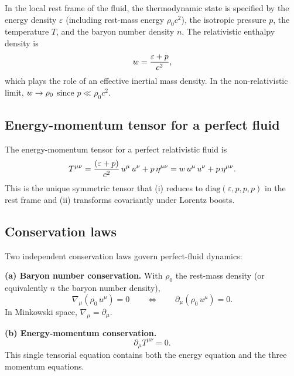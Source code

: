 In the local rest frame of the fluid, the thermodynamic state is
specified by the energy density $\varepsilon$ (including rest-mass
energy $\rho_0 c^2$), the isotropic pressure $p$, the temperature
$T$, and the baryon number density $n$.  The relativistic enthalpy
density is
\begin{equation}
  w = \frac{\varepsilon + p}{c^2},
  \label{eq:rel-enthalpy}
\end{equation}
which plays the role of an effective inertial mass density.  In the
non-relativistic limit, $w \to \rho_0$ since $p \ll \rho_0 c^2$.

\subsection{Energy-momentum tensor for a perfect fluid}
\label{sec:emt-perfect}

The energy-momentum tensor for a perfect relativistic fluid is
\begin{equation}
  T^{\mu\nu} = \frac{(\varepsilon + p)}{c^2}\, u^{\mu}\, u^{\nu}
    + p\, \eta^{\mu\nu}
    = w\, u^{\mu}\, u^{\nu} + p\, \eta^{\mu\nu}.
  \label{eq:rel-emt-perfect}
\end{equation}
This is the unique symmetric tensor that (i) reduces to
$\mathrm{diag}(\varepsilon, p, p, p)$ in the rest frame and
(ii) transforms covariantly under Lorentz boosts.

\subsection{Conservation laws}
\label{sec:conservation}

Two independent conservation laws govern perfect-fluid dynamics:

\medskip\noindent
\textbf{(a) Baryon number conservation.}  With $\rho_0$ the
rest-mass density (or equivalently $n$ the baryon number density),
\begin{equation}
  \nabla_{\mu}(\rho_0\, u^{\mu}) = 0
  \qquad\Longleftrightarrow\qquad
  \partial_{\mu}(\rho_0\, u^{\mu}) = 0.
  \label{eq:rel-continuity}
\end{equation}
In Minkowski space, $\nabla_{\mu} = \partial_{\mu}$.

\medskip\noindent
\textbf{(b) Energy-momentum conservation.}
\begin{equation}
  \partial_{\mu} T^{\mu\nu} = 0.
  \label{eq:rel-emt-cons}
\end{equation}
This single tensorial equation contains both the energy equation
and the three momentum equations.

